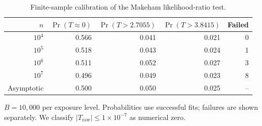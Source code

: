 \begin{table}[ht]
\centering
\caption{Finite-sample calibration of the Makeham likelihood-ratio test.}
\label{tab:sim_calibration}
\begin{tabular}{rrrrr}
\hline
$n$ & $\Pr(T\approx0)$ & $\Pr(T>2.7055)$ & $\Pr(T>3.8415)$ & Failed \\
\hline
$10^{4}$ & 0.566 & 0.041 & 0.021 & 0 \\
$10^{5}$ & 0.518 & 0.043 & 0.024 & 1 \\
$10^{6}$ & 0.511 & 0.052 & 0.027 & 3 \\
$10^{7}$ & 0.496 & 0.049 & 0.023 & 8 \\
\hline
Asymptotic & 0.500 & 0.050 & 0.025 & -- \\
\hline
\end{tabular}
\par\smallskip
{\footnotesize $B=10{,}000$ per exposure level. Probabilities use successful fits; failures are shown separately. We classify $|T_{\mathrm{raw}}|\leq 1\times10^{-7}$ as numerical zero. }
\end{table}
